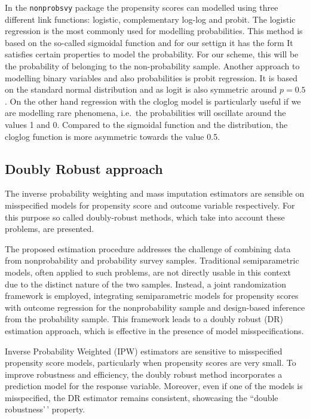\documentclass[
]{jss}
\begin{document}
In the \texttt{nonprobsvy} package the propensity scores can modelled
using three different link functions: logistic, complementary log-log
and probit. The logistic regression is the most commonly used for
modelling probabilities. This method is based on the so-called sigmoidal
function and for our settign it has the form It satisfies certain
properties to model the probability. For our scheme, this will be the
probability of belonging to the non-probability sample. Another approach
to modelling binary variables and also probabilities is probit
regression. It is based on the standard normal distribution and as logit
is also symmetric around \(p = 0.5\). On the other hand regression with
the cloglog model is particularly useful if we are modelling rare
phenomena, i.e.~the probabilities will oscillate around the values 1 and
0. Compared to the sigmoidal function and the distribution, the cloglog
function is more asymmetric towards the value 0.5.

\subsection{Doubly Robust approach}\label{sec-dr-approach}

The inverse probability weighting and mass imputation estimators are
sensible on misspecified models for propensity score and outcome
variable respectively. For this purpose so called doubly-robust methods,
which take into account these problems, are presented.

The proposed estimation procedure addresses the challenge of combining
data from nonprobability and probability survey samples. Traditional
semiparametric models, often applied to such problems, are not directly
usable in this context due to the distinct nature of the two samples.
Instead, a joint randomization framework is employed, integrating
semiparametric models for propensity scores with outcome regression for
the nonprobability sample and design-based inference from the
probability sample. This framework leads to a doubly robust (DR)
estimation approach, which is effective in the presence of model
misspecifications.

Inverse Probability Weighted (IPW) estimators are sensitive to
misspecified propensity score models, particularly when propensity
scores are very small. To improve robustness and efficiency, the doubly
robust method incorporates a prediction model for the response variable.
Moreover, even if one of the models is misspecified, the DR estimator
remains consistent, showcasing the ``double robustness'\,' property.
\end{document}
